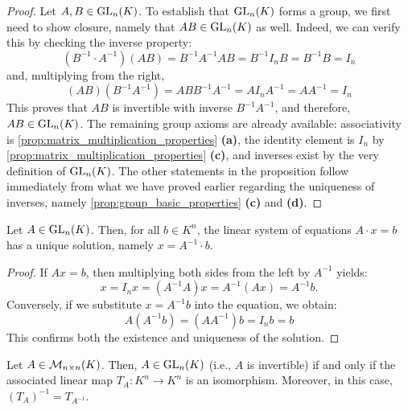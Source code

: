 \begin{proof}
Let $A, B \in \operatorname{GL}_n(K)$. To establish that $\operatorname{GL}_n(K)$ forms a group, we first need to show closure, namely that $AB \in \operatorname{GL}_n(K)$ as well. Indeed, we can verify this by checking the inverse property:
\begin{equation*}
    (B^{-1} \cdot A^{-1})(AB) = B^{-1}A^{-1}AB = B^{-1}I_nB = B^{-1}B = I_n
\end{equation*}
and, multiplying from the right,
\begin{equation*}
    (AB)(B^{-1}A^{-1}) = ABB^{-1}A^{-1} = AI_nA^{-1} = AA^{-1} = I_n
\end{equation*}
This proves that $AB$ is invertible with inverse $B^{-1}A^{-1}$, and therefore, $AB \in \operatorname{GL}_n(K)$. The remaining group axioms are already available: associativity is \cref{prop:matrix_multiplication_properties} \textbf{(a)}, the identity element is $I_n$ by \cref{prop:matrix_multiplication_properties} \textbf{(c)}, and inverses exist by the very definition of $\operatorname{GL}_n(K)$. The other statements in the proposition follow immediately from what we have proved earlier regarding the uniqueness of inverses, namely \cref{prop:group_basic_properties} \textbf{(c)} and \textbf{(d)}.
\end{proof}

\begin{corollary}
\label{cor:unique_solution_via_inverse}
Let $A \in \operatorname{GL}_n(K)$. Then, for all $b \in K^n$, the linear system of equations $A \cdot x = b$ has a unique solution, namely $x = A^{-1} \cdot b$.
\end{corollary}

\begin{proof}
If $Ax = b$, then multiplying both sides from the left by $A^{-1}$ yields:
\begin{equation*}
    x = I_n x = (A^{-1} A) x = A^{-1}(Ax) = A^{-1} b.
\end{equation*}
Conversely, if we substitute $x = A^{-1}b$ into the equation, we obtain:
\begin{equation*}
    A(A^{-1}b) = (AA^{-1})b = I_n b = b
\end{equation*}
This confirms both the existence and uniqueness of the solution.
\end{proof}

\begin{proposition}
\label{prop:invertibility_isomorphism_equivalence}
Let $A \in \mathcal{M}_{n \times n}(K)$. Then, $A \in \operatorname{GL}_n(K)$ (i.e., $A$ is invertible) if and only if the associated linear map $T_A: K^n \to K^n$ is an isomorphism. Moreover, in this case, $(T_A)^{-1} = T_{A^{-1}}$.
\end{proposition}

